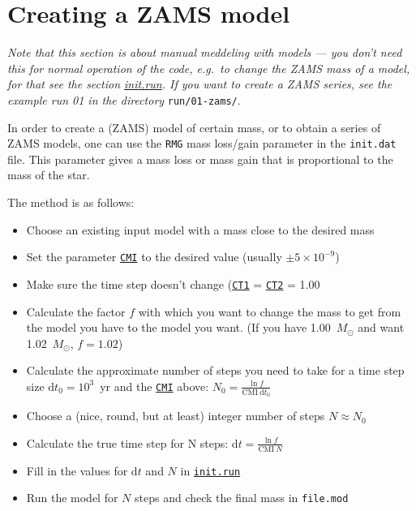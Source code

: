 \section{Creating a ZAMS model}

\emph{
  Note that this section is about manual meddeling with models --- you don't need this for normal operation of the code, 
  e.g.\ to change the ZAMS mass of a model, for that see the section \hyperlink{initrun}{init.run}.
If you want to create a ZAMS series, see the example run 01 in the directory} \texttt{run/01-zams/}.


\vspace*{0.5cm}

In order to create a (ZAMS) model of certain mass, or to obtain a series
of ZAMS models, one can use the \texttt{RMG} mass loss/gain parameter in
the \texttt{init.dat} file.  This parameter gives a mass loss or mass gain
that is proportional to the mass of the star.

The method is as follows:

\begin{itemize}
\item Choose an existing input model with a mass close to the desired mass

\item Set the parameter \hyperlink{cmi}{\texttt{CMI}} to the desired value (usually $\pm 5 \times 10^{-9}$)

\item Make sure the time step doesn't change (\hyperlink{ct1}{\texttt{CT1}} = \hyperlink{ct2}{\texttt{CT2}} = 1.00

\item Calculate the factor $f$ with which you want to change the mass to get from the model
you have to the model you want. (If you have 1.00~$M_\odot$ and want 1.02~$M_\odot$, $f=1.02$)

\item Calculate the approximate number of steps you need to take for a time step size 
$\mathrm{d}t_0 = 10^3$~yr and the \hyperlink{cmi}{\texttt{CMI}} above: $N_0 = \frac{\ln f}{\mathrm{CMI}~ \mathrm{d}t_0}$

\item Choose a (nice, round, but at least) integer number of steps $N \approx N_0$

\item Calculate the true time step for N steps: $\mathrm{d}t = \frac{\ln f}{\mathrm{CMI} ~N}$

\item Fill in the values for $\mathrm{d}t$ and $N$ in \hyperlink{initrun}{\texttt{init.run}}

\item Run the model for $N$ steps and check the final mass in \texttt{file.mod}
\end{itemize}

